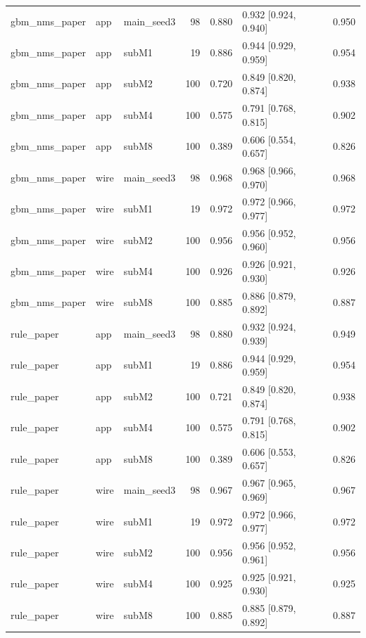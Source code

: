 \begin{table}
\begin{tabular}{lllrrlr}
gbm\_nms\_paper & app & main\_seed3 & 98 & 0.880 & 0.932 [0.924, 0.940] & 0.950 \\
gbm\_nms\_paper & app & subM1 & 19 & 0.886 & 0.944 [0.929, 0.959] & 0.954 \\
gbm\_nms\_paper & app & subM2 & 100 & 0.720 & 0.849 [0.820, 0.874] & 0.938 \\
gbm\_nms\_paper & app & subM4 & 100 & 0.575 & 0.791 [0.768, 0.815] & 0.902 \\
gbm\_nms\_paper & app & subM8 & 100 & 0.389 & 0.606 [0.554, 0.657] & 0.826 \\
gbm\_nms\_paper & wire & main\_seed3 & 98 & 0.968 & 0.968 [0.966, 0.970] & 0.968 \\
gbm\_nms\_paper & wire & subM1 & 19 & 0.972 & 0.972 [0.966, 0.977] & 0.972 \\
gbm\_nms\_paper & wire & subM2 & 100 & 0.956 & 0.956 [0.952, 0.960] & 0.956 \\
gbm\_nms\_paper & wire & subM4 & 100 & 0.926 & 0.926 [0.921, 0.930] & 0.926 \\
gbm\_nms\_paper & wire & subM8 & 100 & 0.885 & 0.886 [0.879, 0.892] & 0.887 \\
rule\_paper & app & main\_seed3 & 98 & 0.880 & 0.932 [0.924, 0.939] & 0.949 \\
rule\_paper & app & subM1 & 19 & 0.886 & 0.944 [0.929, 0.959] & 0.954 \\
rule\_paper & app & subM2 & 100 & 0.721 & 0.849 [0.820, 0.874] & 0.938 \\
rule\_paper & app & subM4 & 100 & 0.575 & 0.791 [0.768, 0.815] & 0.902 \\
rule\_paper & app & subM8 & 100 & 0.389 & 0.606 [0.553, 0.657] & 0.826 \\
rule\_paper & wire & main\_seed3 & 98 & 0.967 & 0.967 [0.965, 0.969] & 0.967 \\
rule\_paper & wire & subM1 & 19 & 0.972 & 0.972 [0.966, 0.977] & 0.972 \\
rule\_paper & wire & subM2 & 100 & 0.956 & 0.956 [0.952, 0.961] & 0.956 \\
rule\_paper & wire & subM4 & 100 & 0.925 & 0.925 [0.921, 0.930] & 0.925 \\
rule\_paper & wire & subM8 & 100 & 0.885 & 0.885 [0.879, 0.892] & 0.887 \\
\bottomrule
\end{tabular}
\end{table}
